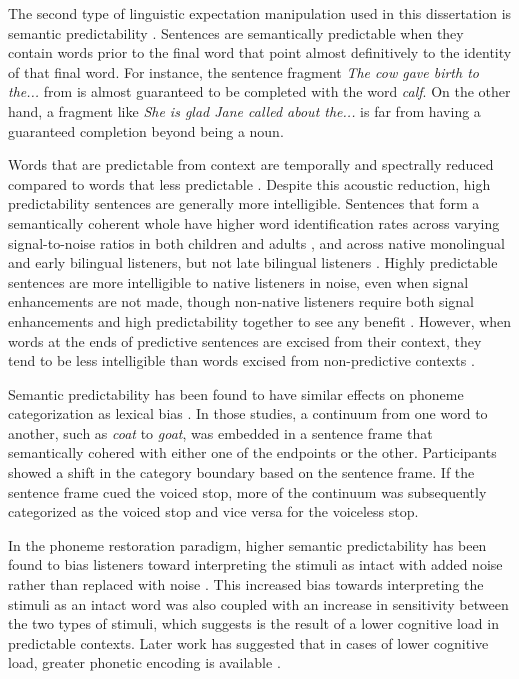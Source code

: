 The second type of linguistic expectation manipulation used in this dissertation is semantic predictability \citep{Kalikow1977}.
Sentences are semantically predictable when they contain words prior to the final word that point almost definitively to the identity of that final word.  
For instance, the sentence fragment \emph{The cow gave birth to the...} from \citet{Kalikow1977} is almost guaranteed to be completed with the word \emph{calf}.  
On the other hand, a fragment like \emph{She is glad Jane called about the...} is far from having a guaranteed completion beyond being a noun.

Words that are predictable from context are temporally and spectrally reduced compared to words that less predictable \cite{Scarborough2010, Clopper2008}. Despite this acoustic reduction, high predictability sentences are generally more intelligible.
Sentences that form a semantically coherent whole have higher word identification rates across varying signal-to-noise ratios \citep{Kalikow1977} in both children and adults \citep{Fallon2002}, and across native monolingual and early bilingual listeners, but not late bilingual listeners \citep{Mayo1997}.
Highly predictable sentences are more intelligible to native listeners in noise, even when signal enhancements are not made, though non-native listeners require both signal enhancements and high predictability together to see any benefit \cite{Bradlow2007}.
However, when words at the ends of predictive sentences are excised from their context, they tend to be less intelligible than words excised from non-predictive contexts \citep{Lieberman1963}.

Semantic predictability has been found to have similar effects on phoneme categorization as lexical bias \citep{Connine1987, Borsky1998}.  
In those studies, a continuum from one word to another, such as \emph{coat} to \emph{goat}, was embedded in a sentence frame that semantically cohered with either one of the endpoints or the other.  
Participants showed a shift in the category boundary based on the sentence frame.
If the sentence frame cued the voiced stop, more of the continuum was subsequently categorized as the voiced stop and vice versa for the voiceless stop.

In the phoneme restoration paradigm, higher semantic predictability has been found to bias listeners toward interpreting the stimuli as intact with added noise rather than replaced with noise \citep{Samuel1981}.
This increased bias towards interpreting the stimuli as an intact word was also coupled with an increase in sensitivity between the two types of stimuli, which \citet{Samuel1981} suggests is the result of a lower cognitive load in predictable contexts. Later work has suggested that in cases of lower cognitive load, greater phonetic encoding is available \citep[see also][]{Mattys2011}.

